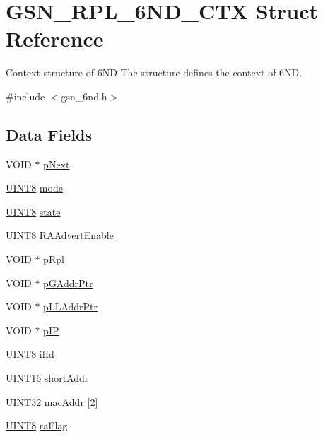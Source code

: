 \hypertarget{a00194}{
\section{GSN\_\-RPL\_\-6ND\_\-CTX Struct Reference}
\label{a00194}
}


Context structure of 6ND The structure defines the context of 6ND.  




{\ttfamily \#include $<$gsn\_\-6nd.h$>$}

\subsection*{Data Fields}
\begin{DoxyCompactItemize}
\item 
VOID $\ast$ \hyperlink{a00194_ac78e1d83d7abdcc1c3ac268f3c1c1eae}{pNext}
\item 
\hyperlink{a00660_gab27e9918b538ce9d8ca692479b375b6a}{UINT8} \hyperlink{a00194_a7d61d79fa98a45545166420dec0d8f3d}{mode}
\item 
\hyperlink{a00660_gab27e9918b538ce9d8ca692479b375b6a}{UINT8} \hyperlink{a00194_a6e9c4cbd32a1178b12f3a61f6855c896}{state}
\item 
\hyperlink{a00660_gab27e9918b538ce9d8ca692479b375b6a}{UINT8} \hyperlink{a00194_a775fba1092bccc056e88151dc1547f8f}{RAAdvertEnable}
\item 
VOID $\ast$ \hyperlink{a00194_a6cae917378bea6a4bf6b1c9262334b96}{pRpl}
\item 
VOID $\ast$ \hyperlink{a00194_a44c82515db2c87ec5847d9e72695ade0}{pGAddrPtr}
\item 
VOID $\ast$ \hyperlink{a00194_a1b507625be685ecf12811b9d3ec8d633}{pLLAddrPtr}
\item 
VOID $\ast$ \hyperlink{a00194_aea015861cc964f97c61cc651f155451e}{pIP}
\item 
\hyperlink{a00660_gab27e9918b538ce9d8ca692479b375b6a}{UINT8} \hyperlink{a00194_a0f9aaec90ed26330a798d110bc4bc237}{ifId}
\item 
\hyperlink{a00660_ga09f1a1fb2293e33483cc8d44aefb1eb1}{UINT16} \hyperlink{a00194_a9b19e8e3387061f7498579b37cdbabdf}{shortAddr}
\item 
\hyperlink{a00660_gae1e6edbbc26d6fbc71a90190d0266018}{UINT32} \hyperlink{a00194_aeeaea6bb1ea47caa7e0601c6158f15de}{macAddr} \mbox{[}2\mbox{]}
\item 
\hyperlink{a00660_gab27e9918b538ce9d8ca692479b375b6a}{UINT8} \hyperlink{a00194_a822a0124d2c88dd7fb00f7f5eb74aaae}{raFlag}

\end{DoxyCompactItemize}
